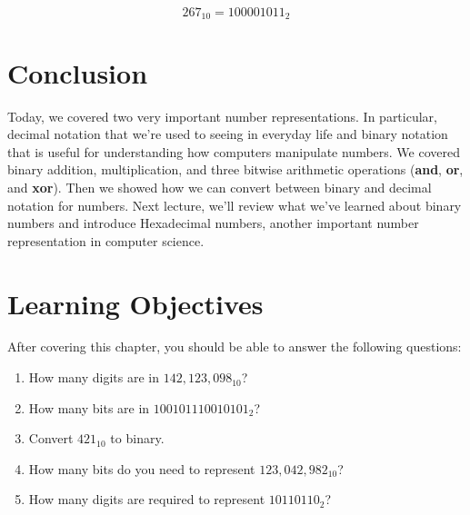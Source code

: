 $$267_{10} = 100001011_2$$

\section{Conclusion}
Today, we covered two very important number representations. In particular,
decimal notation that we’re used to seeing in everyday life and binary notation
that is useful for understanding how computers manipulate numbers. We covered
binary addition, multiplication, and three bitwise arithmetic operations
(\textbf{and}, \textbf{or}, and \textbf{xor}). Then we showed how we can convert
between binary and decimal notation for numbers. Next lecture, we’ll review what
we’ve learned about binary numbers and introduce Hexadecimal numbers, another
important number representation in computer science.

\section{Learning Objectives}
After covering this chapter, you should be able to answer the following questions:
\begin{enumerate}
\item How many digits are in $142,123,098_{10}$?
\item How many bits are in $100101110010101_2$?
\item Convert $421_{10}$ to binary.
\item How many bits do you need to represent $123,042,982_{10}$?
\item How many digits are required to represent $10110110_2$?
\end{enumerate}
